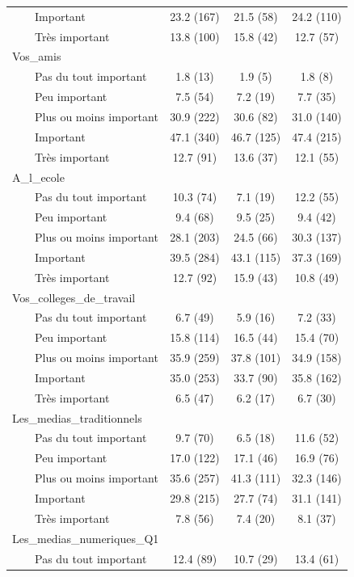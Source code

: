 \documentclass[
]{article}
\begin{document}
\begin{table}[!t]
\begin{tabular*}{\linewidth}{@{\extracolsep{\fill}}lccc}
    Important & 23.2 (167) & 21.5 (58) & 24.2 (110) \\ 
    Très important & 13.8 (100) & 15.8 (42) & 12.7 (57) \\ 
Vos\_amis &  &  &  \\ 
    Pas du tout important & 1.8 (13) & 1.9 (5) & 1.8 (8) \\ 
    Peu important & 7.5 (54) & 7.2 (19) & 7.7 (35) \\ 
    Plus ou moins important & 30.9 (222) & 30.6 (82) & 31.0 (140) \\ 
    Important & 47.1 (340) & 46.7 (125) & 47.4 (215) \\ 
    Très important & 12.7 (91) & 13.6 (37) & 12.1 (55) \\ 
A\_l\_ecole &  &  &  \\ 
    Pas du tout important & 10.3 (74) & 7.1 (19) & 12.2 (55) \\ 
    Peu important & 9.4 (68) & 9.5 (25) & 9.4 (42) \\ 
    Plus ou moins important & 28.1 (203) & 24.5 (66) & 30.3 (137) \\ 
    Important & 39.5 (284) & 43.1 (115) & 37.3 (169) \\ 
    Très important & 12.7 (92) & 15.9 (43) & 10.8 (49) \\ 
Vos\_colleges\_de\_travail &  &  &  \\ 
    Pas du tout important & 6.7 (49) & 5.9 (16) & 7.2 (33) \\ 
    Peu important & 15.8 (114) & 16.5 (44) & 15.4 (70) \\ 
    Plus ou moins important & 35.9 (259) & 37.8 (101) & 34.9 (158) \\ 
    Important & 35.0 (253) & 33.7 (90) & 35.8 (162) \\ 
    Très important & 6.5 (47) & 6.2 (17) & 6.7 (30) \\ 
Les\_medias\_traditionnels &  &  &  \\ 
    Pas du tout important & 9.7 (70) & 6.5 (18) & 11.6 (52) \\ 
    Peu important & 17.0 (122) & 17.1 (46) & 16.9 (76) \\ 
    Plus ou moins important & 35.6 (257) & 41.3 (111) & 32.3 (146) \\ 
    Important & 29.8 (215) & 27.7 (74) & 31.1 (141) \\ 
    Très important & 7.8 (56) & 7.4 (20) & 8.1 (37) \\ 
Les\_medias\_numeriques\_Q1 &  &  &  \\ 
    Pas du tout important & 12.4 (89) & 10.7 (29) & 13.4 (61) \\ 

\end{tabular*}
\end{table}
\end{document}
